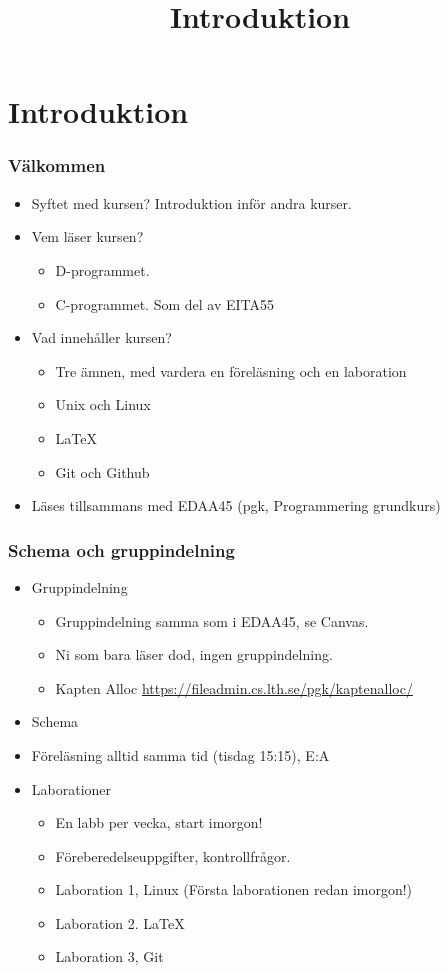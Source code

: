 
\title{Introduktion}
\section{Introduktion}


\begin{frame}[fragile=singleslide]
	\frametitle{Välkommen}
	\begin{itemize}
		\item Syftet med kursen? Introduktion inför andra kurser.
		\item Vem läser kursen?
		      \begin{itemize}
			      \item D-programmet.
			      \item C-programmet. Som del av EITA55
		      \end{itemize}
		\item Vad innehåller kursen?
		      \begin{itemize}
			      \item Tre ämnen, med vardera en föreläsning och en laboration
			      \item Unix och Linux
			      \item \LaTeX
			      \item Git och Github
		      \end{itemize}
		\item Läses tillsammans med EDAA45 (pgk, Programmering grundkurs)
	\end{itemize}
\end{frame}


\begin{frame}[fragile=singleslide]
	\frametitle{Schema och gruppindelning}

	\begin{itemize}
		\item Gruppindelning
		      \begin{itemize}
			      \item Gruppindelning samma som i EDAA45, se Canvas.
			      \item Ni som bara läser dod, ingen gruppindelning.
			      \item Kapten Alloc \url{https://fileadmin.cs.lth.se/pgk/kaptenalloc/}
		      \end{itemize}
		\item Schema
		\item Föreläsning alltid samma tid (tisdag 15:15), E:A
		\item Laborationer
		      \begin{itemize}
			      \item En labb per vecka, start imorgon!
			      \item Föreberedelseuppgifter, kontrollfrågor.
			      \item Laboration 1, Linux (Första laborationen redan imorgon!)
			      \item Laboration 2. \LaTeX
			      \item Laboration 3, Git
		      \end{itemize}
	\end{itemize}
\end{frame}



